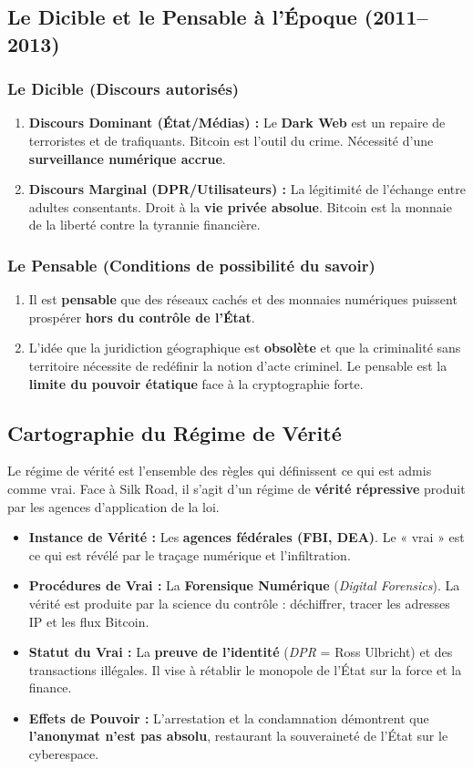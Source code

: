 \documentclass[a4paper,12pt]{report}
\begin{document}
	\subsection*{Le Dicible et le Pensable à l'Époque (2011--2013)}
	\subsubsection{Le Dicible (Discours autorisés)}
	\begin{enumerate}
		\item \textbf{Discours Dominant (État/Médias) :} Le \textbf{Dark Web} est un repaire de terroristes et de trafiquants. Bitcoin est l'outil du crime. Nécessité d'une \textbf{surveillance numérique accrue}.
		\item \textbf{Discours Marginal (DPR/Utilisateurs) :} La légitimité de l'échange entre adultes consentants. Droit à la \textbf{vie privée absolue}. Bitcoin est la monnaie de la liberté contre la tyrannie financière.
	\end{enumerate}
	\subsubsection{Le Pensable (Conditions de possibilité du savoir)}
	\begin{enumerate}
		\item Il est \textbf{pensable} que des réseaux cachés et des monnaies numériques puissent prospérer \textbf{hors du contrôle de l'État}.
		\item L'idée que la juridiction géographique est \textbf{obsolète} et que la criminalité sans territoire nécessite de redéfinir la notion d'acte criminel. Le pensable est la \textbf{limite du pouvoir étatique} face à la cryptographie forte.
	\end{enumerate}
	
	\subsection*{Cartographie du Régime de Vérité}
	Le régime de vérité est l'ensemble des règles qui définissent ce qui est admis comme vrai. Face à Silk Road, il s'agit d'un régime de \textbf{vérité répressive} produit par les agences d'application de la loi.
	\begin{itemize}
		\item \textbf{Instance de Vérité :} Les \textbf{agences fédérales (FBI, DEA)}. Le « vrai » est ce qui est révélé par le traçage numérique et l'infiltration.
		\item \textbf{Procédures de Vrai :} La \textbf{Forensique Numérique} (\textit{Digital Forensics}). La vérité est produite par la science du contrôle : déchiffrer, tracer les adresses IP et les flux Bitcoin.
		\item \textbf{Statut du Vrai :} La \textbf{preuve de l'identité} (\textit{DPR} = Ross Ulbricht) et des transactions illégales. Il vise à rétablir le monopole de l'État sur la force et la finance.
		\item \textbf{Effets de Pouvoir :} L'arrestation et la condamnation démontrent que \textbf{l'anonymat n'est pas absolu}, restaurant la souveraineté de l'État sur le cyberespace.
	\end{itemize}
	
\end{document}
